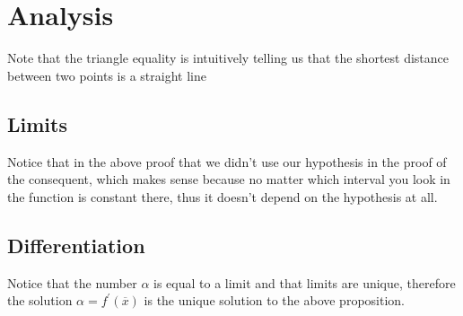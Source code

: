 \chapter{Analysis}


Note that the triangle equality is intuitively telling us that the shortest distance between two points is a straight line


\section{Limits}


Notice that in the above proof that we didn't use our hypothesis in the proof of the consequent, which makes sense because no matter which interval you look in the function is constant there, thus it doesn't depend on the hypothesis at all.




\newpage

\section{Differentiation}



Notice that the number $ \alpha $ is equal to a limit and that limits are unique, therefore the solution $ \alpha =  f ^{ \prime } \left( \overline{x} \right)  $ is the unique solution to the above proposition.


